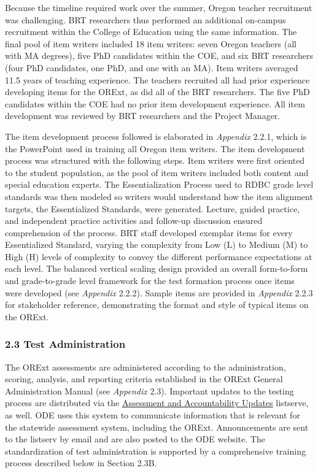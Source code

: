 \documentclass[]{article}
\begin{document}
Because the timeline required work over the summer, Oregon teacher
recruitment was challenging. BRT researchers thus performed an
additional on-campus recruitment within the College of Education using
the same information. The final pool of item writers included 18 item
writers: seven Oregon teachers (all with MA degrees), five PhD
candidates within the COE, and six BRT researchers (four PhD candidates,
one PhD, and one with an MA). Item writers averaged 11.5 years of
teaching experience. The teachers recruited all had prior experience
developing items for the ORExt, as did all of the BRT researchers. The
five PhD candidates within the COE had no prior item development
experience. All item development was reviewed by BRT researchers and the
Project Manager.

The item development process followed is elaborated in \emph{Appendix}
2.2.1, which is the PowerPoint used in training all Oregon item writers.
The item development process was structured with the following steps.
Item writers were first oriented to the student population, as the pool
of item writers included both content and special education experts. The
Essentialization Process used to RDBC grade level standards was then
modeled so writers would understand how the item alignment targets, the
Essentialized Standards, were generated. Lecture, guided practice, and
independent practice activities and follow-up discussion ensured
comprehension of the process. BRT staff developed exemplar items for
every Essentialized Standard, varying the complexity from Low (L) to
Medium (M) to High (H) levels of complexity to convey the different
performance expectations at each level. The balanced vertical scaling
design provided an overall form-to-form and grade-to-grade level
framework for the test formation process once items were developed (see
\emph{Appendix} 2.2.2). Sample items are provided in \emph{Appendix}
2.2.3 for stakeholder reference, demonstrating the format and style of
typical items on the ORExt.

\hypertarget{test-administration}{%
\subsubsection{2.3 Test Administration}\label{test-administration}}

The ORExt assessments are administered according to the administration,
scoring, analysis, and reporting criteria established in the ORExt
General Administration Manual (see \emph{Appendix} 2.3). Important
updates to the testing process are distributed via the
\color{link}\href{http://www.oregon.gov/ode/educator-resources/assessment/Pages/Assessment-and-Accountability-Update.aspx}{Assessment
and Accountability Updates} \color{black} listserve, as well. ODE uses
this system to communicate information that is relevant for the
statewide assessment system, including the ORExt. Announcements are sent
to the listserv by email and are also posted to the ODE website. The
standardization of test administration is supported by a comprehensive
training process described below in Section 2.3B.
\end{document}
